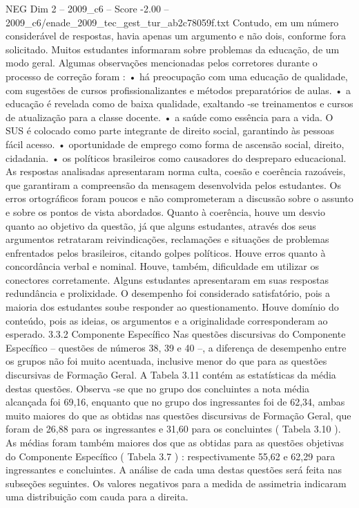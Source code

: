 \begin{textsample}{NEG Dim 2 – 2009\_c6 – Score -2.00 – 2009\_c6/enade\_2009\_tec\_gest\_tur\_ab2c78059f.txt}
Contudo, em um número considerável de respostas, havia apenas um argumento e não dois, conforme fora solicitado.
Muitos estudantes informaram sobre problemas da educação, de um modo geral.
Algumas observações mencionadas pelos corretores durante o processo de correção foram : • há preocupação com uma educação de qualidade, com sugestões de cursos profissionalizantes e métodos preparatórios de aulas. • a educação é revelada como de baixa qualidade, exaltando -se treinamentos e cursos de atualização para a classe docente. • a saúde como essência para a vida.
O SUS é colocado como parte integrante de direito social, garantindo às pessoas fácil acesso. • oportunidade de emprego como forma de ascensão social, direito, cidadania. • os políticos brasileiros como causadores do despreparo educacional.
As respostas analisadas apresentaram norma culta, coesão e coerência razoáveis, que garantiram a compreensão da mensagem desenvolvida pelos estudantes.
Os erros ortográficos foram poucos e não comprometeram a discussão sobre o assunto e sobre os pontos de vista abordados.
Quanto à coerência, houve um desvio quanto ao objetivo da questão, já que alguns estudantes, através dos seus argumentos retrataram reivindicações, reclamações e situações de problemas enfrentados pelos brasileiros, citando golpes políticos.
Houve erros quanto à concordância verbal e nominal.
Houve, também, dificuldade em utilizar os conectores corretamente.
Alguns estudantes apresentaram em suas respostas redundância e prolixidade.
O desempenho foi considerado satisfatório, pois a maioria dos estudantes soube responder ao questionamento.
Houve domínio do conteúdo, pois as ideias, os argumentos e a originalidade corresponderam ao esperado. 3.3.2 Componente Específico Nas questões discursivas do Componente Específico – questões de números 38, 39 e 40 –, a diferença de desempenho entre os grupos não foi muito acentuada, inclusive menor do que para as questões discursivas de Formação Geral.
A Tabela 3.11 contém as estatísticas da média destas questões.
Observa -se que no grupo dos concluintes a nota média alcançada foi 69,16, enquanto que no grupo dos ingressantes foi de 62,34, ambas muito maiores do que as obtidas nas questões discursivas de Formação Geral, que foram de 26,88 para os ingressantes e 31,60 para os concluintes ( Tabela 3.10 ).
As médias foram também maiores dos que as obtidas para as questões objetivas do Componente Específico ( Tabela 3.7 ) : respectivamente 55,62 e 62,29 para ingressantes e concluintes.
A análise de cada uma destas questões será feita nas subseções seguintes.
Os valores negativos para a medida de assimetria indicaram uma distribuição com cauda para a direita.

\end{textsample}
